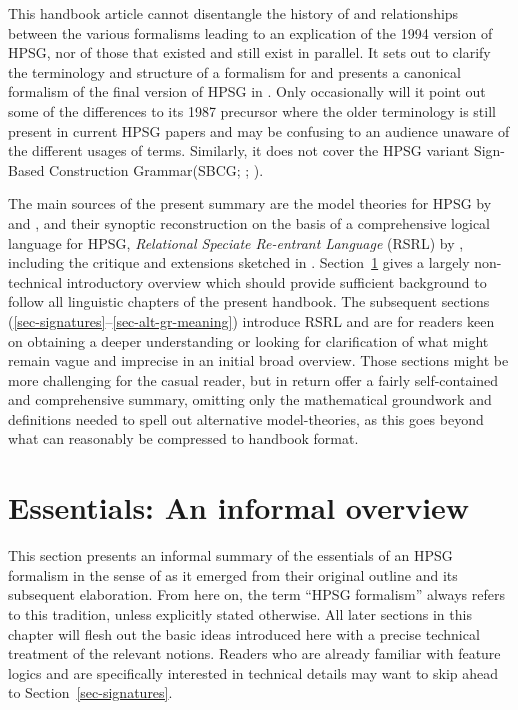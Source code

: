 \documentclass[output=paper,biblatex,babelshorthands,newtxmath,draftmode,colorlinks,citecolor=brown]{langscibook}
\begin{document}
This handbook article cannot disentangle the history of and relationships
between the various formalisms leading to an explication of the
1994 version of HPSG, nor of those that existed and still exist in
parallel. It sets out to clarify the terminology and
structure of a formalism for  and
presents a canonical formalism of the final version of
HPSG in . Only occasionally will it point out some of
the differences to its 1987 precursor where
the older terminology is still present in current HPSG papers and
may be confusing to an audience unaware of the different
usages of terms. Similarly, it does not cover the HPSG variant Sign-Based
Construction Grammar\indexsbcg (SBCG; \citealt{Sag2012a}; ).


The main sources of the present summary are the
model theories for HPSG by \citet{King99a-u} and \citet{Pollard99a}, and
their synoptic reconstruction on the basis of a comprehensive logical
language for HPSG, \emph{Relational Speciate Re-entrant Language}
(RSRL) by \citet{Richter2004a-u}, including the critique and
extensions sketched in
\citet{Richter2007a}. Section~\ref{sec-essentials} gives a largely
non-technical introductory overview which should provide sufficient
background to follow all linguistic chapters of the present
handbook. The subsequent sections
(\ref{sec-signatures}--\ref{sec-alt-gr-meaning}) introduce RSRL and are for readers
keen on obtaining a deeper understanding or looking for clarification
of what might
remain vague and imprecise in an initial broad overview. Those sections
might be more challenging for the casual reader, but in return offer a
fairly self-contained and comprehensive summary, omitting only
the mathematical groundwork and
definitions needed to spell out alternative
model-theories, as this goes beyond what can reasonably be compressed to
handbook format.


\section{Essentials: An informal overview}
\label{sec-essentials}\label{formal:sec-essentials}


This section presents an informal summary of the essentials of an HPSG
formalism in the sense of  as it emerged from their
original outline and its subsequent elaboration. From here on, the term
``HPSG formalism'' always refers to this tradition, unless explicitly
stated otherwise.  All later sections in this chapter will flesh out
the basic ideas introduced here with a precise technical treatment of
the relevant notions. Readers who are already familiar with feature
logics and are specifically interested in technical details may want
to skip ahead to Section~\ref{sec-signatures}.
\end{document}
